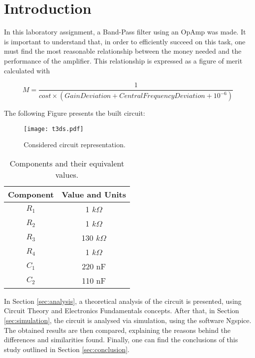 \newpage
\section{Introduction}
\label{sec:introduction}
\vspace{4.5mm}
\par In this laboratory assignment, a Band-Pass filter using an OpAmp was made. It is important to understand that, in order to efficiently succeed on this task, one must find the most reasonable relationship between the money needed and the performance of the amplifier. This relationship is expressed as a figure of merit calculated with

\begin{equation}
M=\frac{1}{cost\times (GainDeviation + CentralFrequencyDeviation+ 10^{-6})}
\end{equation}

The following Figure presents the built circuit:

\begin{figure}[h] \centering
\texttt{[image: t3ds.pdf]}
\caption{Considered circuit representation.}
\label{fig:t3ds}
\end{figure}

\begin{table}[h]
\centering
    \begin{tabular}{c|c}
      \textbf{Component}  & \textbf{Value and Units}\\ \hline
      $R_1$ & 1 $k\Omega$\\
      $R_2$ & 1 $k\Omega$ \\
      $R_3$ & 130 $k\Omega$\\
      $R_4$ & 1 $k\Omega$ \\
      $C_1$ & 220 nF \\
      $C_2$ & 110 nF \\
    \end{tabular}
    \caption{Components and their equivalent values.}
 \label{tab_comps}
\end{table}


\par In Section \ref{sec:analysis}, a theoretical analysis of the circuit is presented, using Circuit Theory and Electronics Fundamentals concepts. After that, in Section \ref{sec:simulation}, the circuit is analysed via simulation, using the software Ngspice. The obtained results are then compared, explaining the reasons behind the differences and similarities found. Finally, one can find the conclusions of this study outlined in Section \ref{sec:conclusion}.